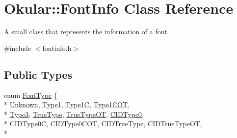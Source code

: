 \hypertarget{classOkular_1_1FontInfo}{\section{Okular\+:\+:Font\+Info Class Reference}
\label{classOkular_1_1FontInfo}
}


A small class that represents the information of a font.  




{\ttfamily \#include $<$fontinfo.\+h$>$}

\subsection*{Public Types}
\begin{DoxyCompactItemize}
\item 
enum \hyperlink{classOkular_1_1FontInfo_a9a7fc21a728ffa7296546c8a527e43f6}{Font\+Type} \{ \\*
\hyperlink{classOkular_1_1FontInfo_a9a7fc21a728ffa7296546c8a527e43f6a8100a61c1f840c930f988ab332f3d517}{Unknown}, 
\hyperlink{classOkular_1_1FontInfo_a9a7fc21a728ffa7296546c8a527e43f6a3585283cb5f23b4f2c5c125d7ca476ee}{Type1}, 
\hyperlink{classOkular_1_1FontInfo_a9a7fc21a728ffa7296546c8a527e43f6aadeac867a2b854b0f60d3e2beb86ec15}{Type1\+C}, 
\hyperlink{classOkular_1_1FontInfo_a9a7fc21a728ffa7296546c8a527e43f6a835ce35f22fd36c6fe92f579dc1efbe9}{Type1\+C\+O\+T}, 
\\*
\hyperlink{classOkular_1_1FontInfo_a9a7fc21a728ffa7296546c8a527e43f6ae92cfa8b74a1ff2a06775b645268b5a9}{Type3}, 
\hyperlink{classOkular_1_1FontInfo_a9a7fc21a728ffa7296546c8a527e43f6a8cf1ff8f7847940498046e85088fccf6}{True\+Type}, 
\hyperlink{classOkular_1_1FontInfo_a9a7fc21a728ffa7296546c8a527e43f6a336cd2993e2cf2eebdbd3eb1bbe5deb3}{True\+Type\+O\+T}, 
\hyperlink{classOkular_1_1FontInfo_a9a7fc21a728ffa7296546c8a527e43f6a5e2fa508a57bbaa5f4f28599586c8562}{C\+I\+D\+Type0}, 
\\*
\hyperlink{classOkular_1_1FontInfo_a9a7fc21a728ffa7296546c8a527e43f6ad027ca0c864510e32b8b672533e4fe6e}{C\+I\+D\+Type0\+C}, 
\hyperlink{classOkular_1_1FontInfo_a9a7fc21a728ffa7296546c8a527e43f6a63bbd4d57f646dcbb2b69462054a619c}{C\+I\+D\+Type0\+C\+O\+T}, 
\hyperlink{classOkular_1_1FontInfo_a9a7fc21a728ffa7296546c8a527e43f6a72f326ebf066e94c7ea28a0b16da75b7}{C\+I\+D\+True\+Type}, 
\hyperlink{classOkular_1_1FontInfo_a9a7fc21a728ffa7296546c8a527e43f6a443e55d0084484d0312ff1def2d0780f}{C\+I\+D\+True\+Type\+O\+T}, 
\\*

\end{DoxyCompactItemize}
